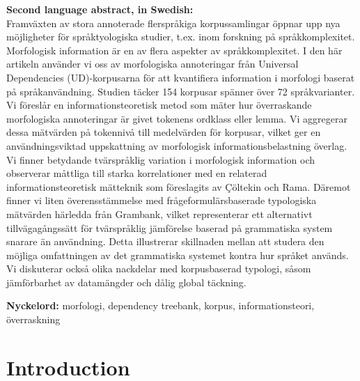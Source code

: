 \documentclass[USenglish]{article}
\begin{document}
\maketitle


\newpage 

\textbf{Second language abstract, in Swedish:}\\

Framväxten av stora annoterade flerspråkiga korpussamlingar öppnar upp nya möjligheter för språktyologiska studier, t.ex. inom forskning på språkkomplexitet.
Morfologisk information är en av flera aspekter av språkkomplexitet. 
I den här artikeln använder vi oss av morfologiska annoteringar från Universal Dependencies (UD)-korpusarna för att kvantifiera information i morfologi baserat på språkanvändning. 
Studien täcker 154 korpusar spänner över 72 språkvarianter.
Vi föreslår en informationsteoretisk metod som mäter hur överraskande morfologiska annoteringar är givet tokenens ordklass eller lemma.
Vi aggregerar dessa mätvärden på tokennivå till medelvärden för korpusar, vilket ger en användningsviktad uppskattning av morfologisk informationsbelastning överlag.
Vi finner betydande tvärspråklig variation i morfologisk information och observerar måttliga till starka korrelationer med en relaterad informationsteoretisk mätteknik som föreslagits av Çöltekin och Rama.
Däremot finner vi liten överensstämmelse med frågeformulärsbaserade typologiska mätvärden härledda från Grambank, vilket representerar ett alternativt tillvägagångssätt för tvärspråklig jämförelse baserad på grammatiska system snarare än användning.
Detta illustrerar skillnaden mellan att studera den möjliga omfattningen av det grammatiska systemet kontra hur språket används.
Vi diskuterar också olika nackdelar med korpusbaserad typologi, såsom jämförbarhet av datamängder och dålig global täckning.

\textbf{Nyckelord:} morfologi, dependency treebank, korpus, informationsteori, överraskning



    
\newpage
\section{Introduction}
\end{document}
